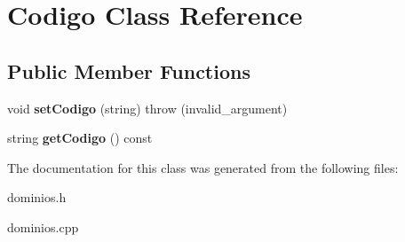 \hypertarget{classCodigo}{}\section{Codigo Class Reference}
\label{classCodigo}
\subsection*{Public Member Functions}
\begin{DoxyCompactItemize}
\item 
\mbox{\label{classCodigo_a863651a26dd7112dccced628aa96d86e}} 
void {\bfseries set\+Codigo} (string)  throw (invalid\+\_\+argument)
\item 
\mbox{\label{classCodigo_ac263b3f7ff4f995fa72ad9101f1a8533}} 
string {\bfseries get\+Codigo} () const
\end{DoxyCompactItemize}


The documentation for this class was generated from the following files\+:\begin{DoxyCompactItemize}
\item 
dominios.\+h\item 
dominios.\+cpp\end{DoxyCompactItemize}
